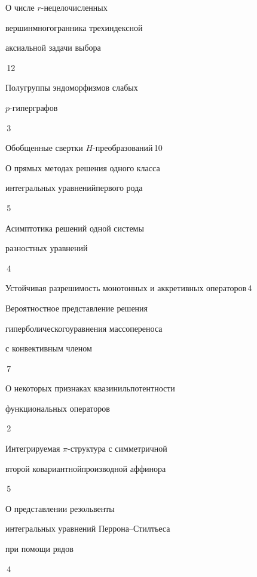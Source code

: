 

{О числе $r$-нецелочисленных


вершин\newline многогранника трехиндексной


аксиальной задачи выбора}{\No\,12}




{Полугруппы эндоморфизмов слабых 


$p$-гиперграфов}{\No\,3}




{Обобщенные свертки $H$-преобразований}{\No\,10}




{О прямых методах решения одного класса


интегральных уравнений\newline первого рода}{\No\,5}




{Асимптотика решений одной системы


разностных уравнений}{\No\,4}




{Устойчивая разрешимость монотонных и аккретивных операторов}{\No\,4}




{Вероятностное представление решения 


гиперболического\newline уравнения массопереноса 


с конвективным членом}{\No\,7}




{О некоторых признаках квазинильпотентности\newline


функциональных операторов}{\No\,2}




{Интегрируемая $\pi$-структура с симметричной  


второй ковариантной\newline производной аффинора}{\No\,5}




{О представлении резольвенты


интегральных уравнений Перрона--Стилтьеса\newline


при помощи рядов}{\No\,4}


